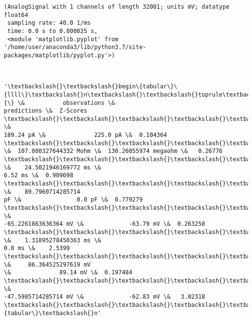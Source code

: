 \documentclass[11pt]{article}
\begin{document}
    

            \begin{tcolorbox}[breakable, size=fbox, boxrule=.5pt, pad at break*=1mm, opacityfill=0]
\begin{Verbatim}[commandchars=\\\{\}]
(AnalogSignal with 1 channels of length 32001; units mV; datatype float64
 sampling rate: 40.0 1/ms
 time: 0.0 s to 0.800025 s,
 <module 'matplotlib.pyplot' from '/home/user/anaconda3/lib/python3.7/site-
packages/matplotlib/pyplot.py'>)
\end{Verbatim}
\end{tcolorbox}
        
    \begin{center}
    \end{center}
    { \hspace*{\fill} \\}
    
            \begin{tcolorbox}[breakable, size=fbox, boxrule=.5pt, pad at break*=1mm, opacityfill=0]
\begin{Verbatim}[commandchars=\\\{\}]
'\textbackslash{}\textbackslash{}begin\{tabular\}\{llll\}\textbackslash{}n\textbackslash{}\textbackslash{}toprule\textbackslash{}n\{\} \&           observations \&
predictions \&  Z-Scores \textbackslash{}\textbackslash{}\textbackslash{}\textbackslash{}\textbackslash{}n\textbackslash{}\textbackslash{}midrule\textbackslash{}nRheobaseTest                   \&
189.24 pA \&              225.0 pA \&  0.104364 \textbackslash{}\textbackslash{}\textbackslash{}\textbackslash{}\textbackslash{}nInputResistanceTest
\&  107.080327644332 Mohm \&  130.26055974 megaohm \&   0.26776
\textbackslash{}\textbackslash{}\textbackslash{}\textbackslash{}\textbackslash{}nTimeConstantTest               \&    24.5021946169772 ms \&
6.52 ms \&  0.909698 \textbackslash{}\textbackslash{}\textbackslash{}\textbackslash{}\textbackslash{}nCapacitanceTest                \&    89.7960714285714
pF \&                0.0 pF \&  0.779279 \textbackslash{}\textbackslash{}\textbackslash{}\textbackslash{}\textbackslash{}nRestingPotentialTest           \&
-65.2261863636364 mV \&             -63.79 mV \&  0.263258
\textbackslash{}\textbackslash{}\textbackslash{}\textbackslash{}\textbackslash{}nInjectedCurrentAPWidthTest     \&    1.31895278450363 ms \&
0.0 ms \&    2.5399 \textbackslash{}\textbackslash{}\textbackslash{}\textbackslash{}\textbackslash{}nInjectedCurrentAPAmplitudeTest \&     86.364525297619 mV
\&              89.14 mV \&  0.197484 \textbackslash{}\textbackslash{}\textbackslash{}\textbackslash{}\textbackslash{}nInjectedCurrentAPThresholdTest \&
-47.5985714285714 mV \&             -62.83 mV \&   3.02318
\textbackslash{}\textbackslash{}\textbackslash{}\textbackslash{}\textbackslash{}n\textbackslash{}\textbackslash{}bottomrule\textbackslash{}n\textbackslash{}\textbackslash{}end\{tabular\}\textbackslash{}n'
\end{Verbatim}
\end{tcolorbox}
        
\end{document}
